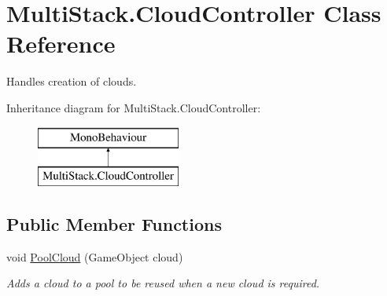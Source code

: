 \hypertarget{class_multi_stack_1_1_cloud_controller}{}\section{Multi\+Stack.\+Cloud\+Controller Class Reference}
\label{class_multi_stack_1_1_cloud_controller}


Handles creation of clouds.  


Inheritance diagram for Multi\+Stack.\+Cloud\+Controller\+:\begin{figure}[H]
\begin{center}
\leavevmode
\includegraphics[height=2.000000cm]{class_multi_stack_1_1_cloud_controller}
\end{center}
\end{figure}
\subsection*{Public Member Functions}
\begin{DoxyCompactItemize}
\item 
void \hyperlink{class_multi_stack_1_1_cloud_controller_a10db53c6e52758567af0bcaf8394b43d}{Pool\+Cloud} (Game\+Object cloud)
\begin{DoxyCompactList}\small\item\em Adds a cloud to a pool to be reused when a new cloud is required. \end{DoxyCompactList}\end{DoxyCompactItemize}
